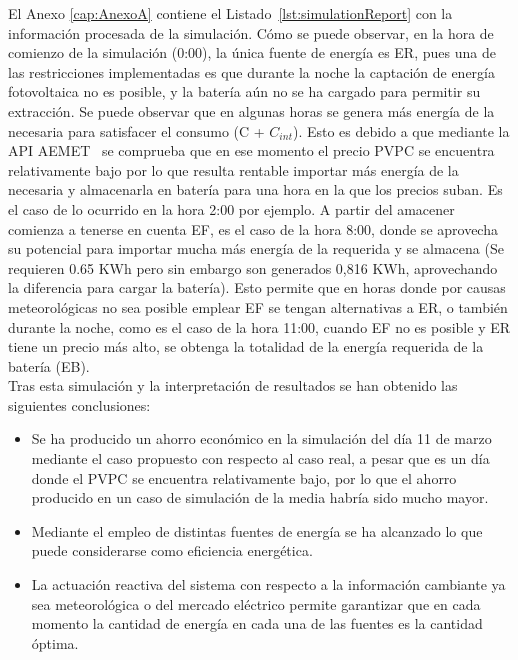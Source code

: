 El Anexo \ref{cap:AnexoA} contiene el Listado~\ref{lst:simulationReport} con la información procesada de la simulación. Cómo se puede observar, en la hora de comienzo de la simulación (0:00), la única fuente de energía es \gls{ER}, pues una de las restricciones implementadas es que durante la noche la captación de energía fotovoltaica no es posible, y la batería aún no se ha cargado para permitir su extracción. Se puede observar que en algunas horas se genera más energía de la necesaria para satisfacer el consumo (C + $ C_{int} $). Esto es debido a que mediante la \gls{API} \gls{AEMET}~\cite{Ree} se comprueba que en ese momento el precio \gls{PVPC} se encuentra relativamente bajo por lo que resulta rentable importar más energía de la necesaria y almacenarla en batería para una hora en la que los precios suban. Es el caso de lo ocurrido en la hora 2:00 por ejemplo. A partir del amacener comienza a tenerse en cuenta \gls{EF}, es el caso de la hora 8:00, donde se aprovecha su potencial para importar mucha más energía de la requerida y se almacena (Se requieren 0.65 KWh pero sin embargo son generados 0,816 KWh, aprovechando la diferencia para cargar la batería). Esto permite que en horas donde por causas meteorológicas no sea posible emplear \gls{EF} se tengan alternativas a \gls{ER}, o también durante la noche, como es el caso de la hora 11:00, cuando \gls{EF} no es posible y \gls{ER} tiene un precio más alto, se obtenga la totalidad de la energía requerida de la batería (\gls{EB}).\\

Tras esta simulación y la interpretación de resultados se han obtenido las siguientes conclusiones:
\begin{itemize}
\item Se ha producido un ahorro económico en la simulación del día 11 de marzo mediante el caso propuesto con respecto al caso real, a pesar que es un día donde el \gls{PVPC} se encuentra relativamente bajo, por lo que el ahorro producido en un caso de simulación de la media habría sido mucho mayor.
\item Mediante el empleo de distintas fuentes de energía se ha alcanzado lo que puede considerarse como eficiencia energética.
  \item La actuación reactiva del sistema con respecto a la información cambiante ya sea meteorológica o del mercado eléctrico permite garantizar que en cada momento la cantidad de energía en cada una de las fuentes es la cantidad óptima.
\end{itemize}
